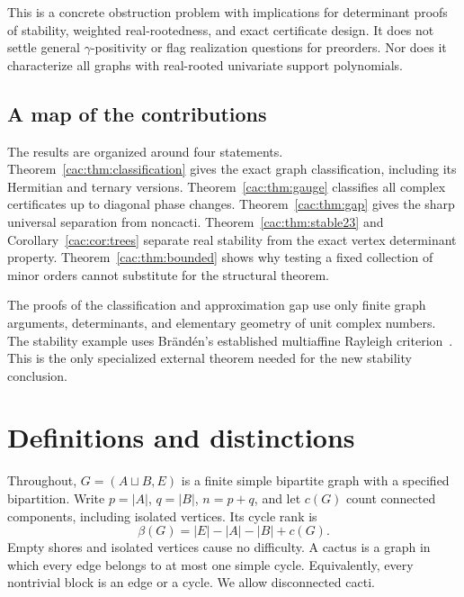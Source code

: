 \documentclass[11pt]{article}
\numberwithin{equation}{section}
\theoremstyle{definition}
\begin{document}
This is a concrete obstruction problem with implications for determinant proofs of stability, weighted real-rootedness, and exact certificate design. It does not settle general $\gamma$-positivity or flag realization questions for preorders. Nor does it characterize all graphs with real-rooted univariate support polynomials.

\subsection{A map of the contributions}
The results are organized around four statements. Theorem~\ref{cac:thm:classification} gives the exact graph classification, including its Hermitian and ternary versions. Theorem~\ref{cac:thm:gauge} classifies all complex certificates up to diagonal phase changes. Theorem~\ref{cac:thm:gap} gives the sharp universal separation from noncacti. Theorem~\ref{cac:thm:stable23} and Corollary~\ref{cac:cor:trees} separate real stability from the exact vertex determinant property. Theorem~\ref{cac:thm:bounded} shows why testing a fixed collection of minor orders cannot substitute for the structural theorem.

The proofs of the classification and approximation gap use only finite graph arguments, determinants, and elementary geometry of unit complex numbers. The stability example uses Br\"and\'en's established multiaffine Rayleigh criterion~\cite[Theorem 5.6]{Branden}. This is the only specialized external theorem needed for the new stability conclusion.

\section{Definitions and distinctions}
\label{cac:sec:definitions}
Throughout, $G=(A\sqcup B,E)$ is a finite simple bipartite graph with a specified bipartition. Write $p=|A|$, $q=|B|$, $n=p+q$, and let $c(G)$ count connected components, including isolated vertices. Its cycle rank is
\[
 \beta(G)=|E|-|A|-|B|+c(G).
\]
Empty shores and isolated vertices cause no difficulty. A cactus is a graph in which every edge belongs to at most one simple cycle. Equivalently, every nontrivial block is an edge or a cycle. We allow disconnected cacti.
\end{document}
